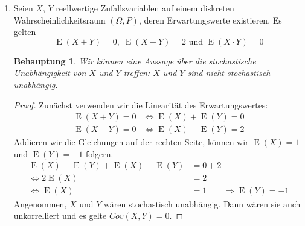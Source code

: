 \documentclass[a4paper]{scrartcl}
\newtheorem*{behaupt}{Behauptung}
\newcommand{\gdw}{\Leftrightarrow}
\newcommand{\cov}{\operatorname{Cov}}
\newcommand{\e}{\operatorname{E}}
\newcommand{\var}{\operatorname{Var}}
\begin{document}
\begin{enumerate}[label=\bfseries\arabic*.]
\begin{enumerate}[label=(\alph*)]
\begin{proof}
\begin{equation*}
\begin{split}
                            &= \frac{b \cdot \cov(X, X)}
                            {\sqrt{\var(X) \cdot \var(X) \cdot b^2}} \\
                            &= \frac{-1 \cdot |b| \cdot \var(X)}
                            {\var(X) \cdot \sqrt{b^2}} \\
                            &= \frac{-1 \cdot |b| \cdot \var(X)}
                            {\var(X) \cdot |b|} = -1
                        \end{split}
                    \end{equation*}
                \end{proof}

        \end{enumerate}

    \item
        Seien $X$, $Y$ reellwertige Zufallsvariablen auf einem diskreten
        Wahrscheinlichkeitsraum $(\Omega, P)$, deren Erwartungswerte
        existieren.
        Es gelten
        \[\e(X+Y) = 0,\; \e(X-Y) = 2 \text{ und } \e(X \cdot Y) = 0\]
        \begin{behaupt}
            Wir können eine Aussage über die stochastische Unabhängigkeit
            von $X$ und $Y$ treffen: $X$ und $Y$ sind nicht stochastisch
            unabhängig.
        \end{behaupt}
        \begin{proof}
            Zunächst verwenden wir die Linearität des Erwartungswertes:
            \begin{align*}
                \e(X + Y) = 0 &\gdw \e(X) + \e(Y) = 0 \\
                \e(X - Y) = 0 &\gdw \e(X) - \e(Y) = 2
            \end{align*}
            Addieren wir die Gleichungen auf der rechten Seite, können wir
            $\e(X) = 1$ und $\e(Y) = -1$ folgern.
            \begin{equation*}
                \begin{split}
                    \e(X) + \e(Y) + \e(X) - \e(Y) &= 0 + 2 \\
                    \gdw 2\e(X) &= 2 \\
                    \gdw \e(X) &= 1 \qquad \Rightarrow \e(Y) = -1
                \end{split}
            \end{equation*}
            Angenommen, $X$ und $Y$ wären stochastisch unabhängig.
            Dann wären sie auch unkorrelliert und es gelte $Cov(X, Y) = 0$.

\end{proof}
\end{enumerate}
\end{document}

